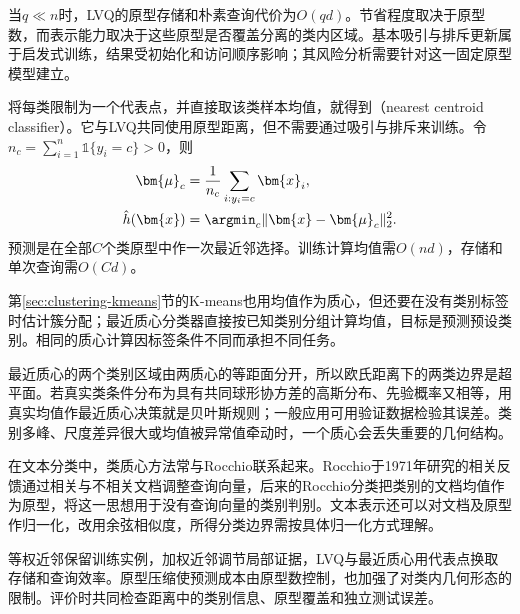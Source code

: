 当$q\ll n$时，LVQ的原型存储和朴素查询代价为$O(qd)$。节省程度取决于原型数，而表示能力取决于这些原型是否覆盖分离的类内区域。基本吸引与排斥更新属于启发式训练，结果受初始化和访问顺序影响；其风险分析需要针对这一固定原型模型建立。

将每类限制为一个代表点，并直接取该类样本均值，就得到（nearest centroid classifier）。它与LVQ共同使用原型距离，但不需要通过吸引与排斥来训练。令$n_c=\sum_{i=1}^n\mathbb{1}\{y_i=c\}>0$，则
\begin{align}
  \bm{\mu}_c&=\frac{1}{n_c}\sum_{i:y_i=c}\bm{x}_i,
  \label{eq:classification-centroid}\\
  \hat h(\bm{x})&=\argmin_c\|\bm{x}-\bm{\mu}_c\|_2^2.
  \label{eq:classification-nearest-centroid}
\end{align}
预测是在全部$C$个类原型中作一次最近邻选择。训练计算均值需$O(nd)$，存储和单次查询需$O(Cd)$。

第\ref{sec:clustering-kmeans}节的K-means也用均值作为质心，但还要在没有类别标签时估计簇分配；最近质心分类器直接按已知类别分组计算均值，目标是预测预设类别。相同的质心计算因标签条件不同而承担不同任务。

最近质心的两个类别区域由两质心的等距面分开，所以欧氏距离下的两类边界是超平面。若真实类条件分布为具有共同球形协方差的高斯分布、先验概率又相等，用真实均值作最近质心决策就是贝叶斯规则；一般应用可用验证数据检验其误差。类别多峰、尺度差异很大或均值被异常值牵动时，一个质心会丢失重要的几何结构。

在文本分类中，类质心方法常与Rocchio联系起来。Rocchio于1971年研究的相关反馈通过相关与不相关文档调整查询向量，后来的Rocchio分类把类别的文档均值作为原型，将这一思想用于没有查询向量的类别判别。文本表示还可以对文档及原型作归一化，改用余弦相似度，所得分类边界需按具体归一化方式理解。

等权近邻保留训练实例，加权近邻调节局部证据，LVQ与最近质心用代表点换取存储和查询效率。原型压缩使预测成本由原型数控制，也加强了对类内几何形态的限制。评价时共同检查距离中的类别信息、原型覆盖和独立测试误差。